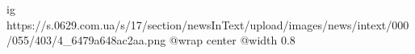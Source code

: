  
 
 
 
 

\ifcmt
  ig https://s.0629.com.ua/s/17/section/newsInText/upload/images/news/intext/000/055/403/4_6479a648ac2aa.png
  @wrap center
  @width 0.8
\fi
